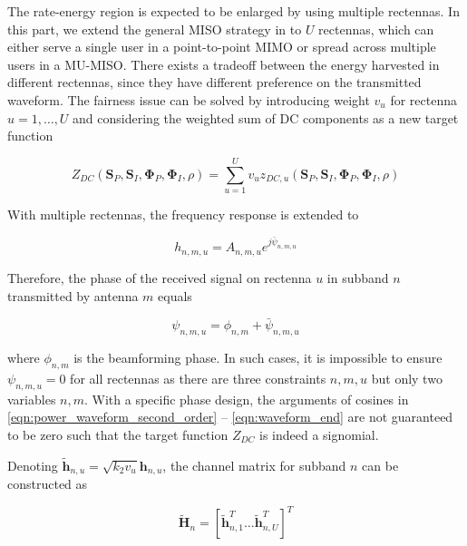 The rate-energy region is expected to be enlarged by using multiple rectennas. In this part, we extend the general MISO strategy in \cite{Clerckx2018} to $U$ rectennas, which can either serve a single user in a point-to-point MIMO or spread across multiple users in a MU-MISO. There exists a tradeoff between the energy harvested in different rectennas, since they have different preference on the transmitted waveform. The fairness issue can be solved by introducing weight ${v_u}$ for rectenna $u = 1, \ldots ,U$ and considering the weighted sum of DC components as a new target function

\begin{equation}\label{eqn:weighted_target}
  {Z_{DC}}\left( {{{\mathbf{S}}_P},{{\mathbf{S}}_I},{{\mathbf{\Phi }}_P},{{\mathbf{\Phi }}_I},\rho } \right) = \sum\limits_{u = 1}^U {{v_u}{z_{DC,u}}\left( {{{\mathbf{S}}_P},{{\mathbf{S}}_I},{{\mathbf{\Phi }}_P},{{\mathbf{\Phi }}_I},\rho } \right)} 
\end{equation}

With multiple rectennas, the frequency response is extended to

\begin{equation}\label{eqn:mo_channel}
  {h_{n,m,u}} = {A_{n,m,u}}{e^{j{{\bar \psi }_{n,m,u}}}}
\end{equation}

Therefore, the phase of the received signal on rectenna $u$ in subband $n$ transmitted by antenna $m$ equals    

\begin{equation}\label{eqn:received_phase}
  {\psi _{n,m,u}} = {\phi _{n,m}} + {{\bar \psi }_{n,m,u}}
\end{equation}

where ${\phi _{n,m}}$ is the beamforming phase. In such cases, it is impossible to ensure ${\psi _{n,m,u}} = 0$ for all rectennas as there are three constraints $n,m,u$ but only two variables $n,m$. With a specific phase design, the arguments of cosines in \eqref{eqn:power_waveform_second_order} -- \eqref{eqn:waveform_end} are not guaranteed to be zero such that the target function ${Z_{DC}}$ is indeed a signomial.

Denoting ${\widetilde {\mathbf{h}}_{n,u}} = \sqrt {{k_2}{v_u}} {{\mathbf{h}}_{n,u}}$, the channel matrix for subband $n$ can be constructed as

\begin{equation}\label{eqn:mo_channel_matrox}
  {\widetilde {\mathbf{H}}_n} = {\left[ {\widetilde {\mathbf{h}}_{n,1}^T \ldots \widetilde {\mathbf{h}}_{n,U}^T} \right]^T}
\end{equation}

